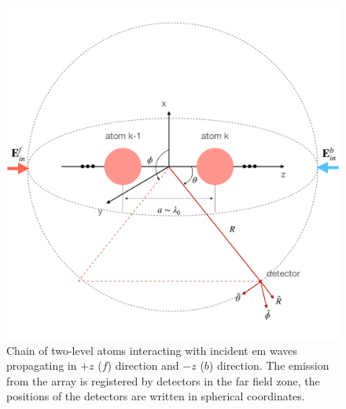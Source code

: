 \documentclass[aps,prl,twocolumn,superscriptaddress,showpacs,amsmath,amssymb]{revtex4-2}
\begin{document}
\begin{figure}[h]
    \centering
    \includegraphics[width=0.9\linewidth]{fig_1}
    \caption{Chain of two-level atoms interacting with incident em waves propagating in $+z$ ($f$) direction and $-z$ ($b$) direction. The emission from the array is registered by detectors in the far field zone, the positions of the detectors are written in spherical coordinates.}
    \label{fig:01}
\end{figure}
\end{document}
